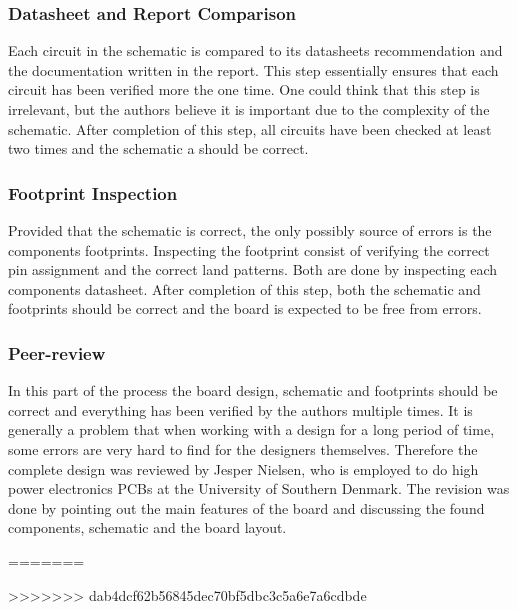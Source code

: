 \subsubsection*{Datasheet and Report Comparison}
Each circuit in the schematic is compared to its datasheets recommendation and the documentation written in the report. 
This step essentially ensures that each circuit has been verified more the one time. 
One could think that this step is irrelevant, but the authors believe it is important due to the complexity of the schematic.
After completion of this step, all circuits have been checked at least two times and the schematic a should be correct. 

\subsubsection*{Footprint Inspection}
Provided that the schematic is correct, the only possibly source of errors is the components footprints. 
Inspecting the footprint consist of verifying the correct pin assignment and the correct land patterns.
Both are done by inspecting each components datasheet. 
After completion of this step, both the schematic and footprints should be correct and the board is expected to be free from errors.

\subsubsection*{Peer-review}
In this part of the process the board design, schematic and footprints should be correct and everything has been verified by the authors multiple times.
It is generally a problem that when working with a design for a long period of time, some errors are very hard to find for the designers themselves. 
Therefore the complete design was reviewed by Jesper Nielsen, who is employed to do high power electronics PCBs at the University of Southern Denmark. 
The revision was done by pointing out the main features of the board and discussing the found components, schematic and the board layout.

=======

>>>>>>> dab4dcf62b56845dec70bf5dbc3c5a6e7a6cdbde
